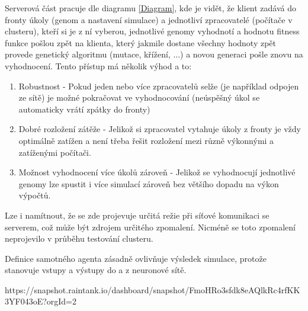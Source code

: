 Serverová část pracuje dle diagramu \ref{Diagram}, kde je vidět, že klient zadává do fronty úkoly (genom a nastavení simulace) a jednotliví zpracovatelé (počítače v clusteru), kteří si je z ní vyberou, jednotlivé genomy vyhodnotí a hodnotu fitness funkce pošlou zpět na klienta, který jakmile dostane všechny hodnoty zpět provede genetický algoritmu (mutace, křížení, ...) a novou generaci pošle znovu na vyhodnocení.
Tento přístup má několik výhod a to:
\begin{enumerate}
	\item Robustnost - Pokud jeden nebo více zpracovatelů selže (je například odpojen ze sítě) je možné pokračovat ve vyhodnocování (neúspěšný úkol se automaticky vrátí zpátky do fronty)
	\item Dobré rozložení zátěže - Jelikož si zpracovatel vytahuje úkoly z fronty je vždy optimálně zatížen a není třeba řešit rozložení mezi různě výkonnými a zatíženými počítači.
	\item Možnost vyhodnocení více úkolů zároveň - Jelikož se vyhodnocují jednotlivé genomy lze spustit i více simulací zároveň bez většího dopadu na výkon výpočtů.
\end{enumerate}

Lze i namítnout, že se zde projevuje určitá režie při síťové komunikaci se serverem, což může být zdrojem určitého zpomalení. Nicméně se toto zpomalení neprojevilo v průběhu testování clusteru.


Definice samotného agenta zásadně ovlivňuje výsledek simulace, protože stanovuje vstupy a výstupy do a z neuronové sítě. 


https://snapshot.raintank.io/dashboard/snapshot/FmoHRo3sfdk8eAQlkRc4rfKK3YF043oE?orgId=2